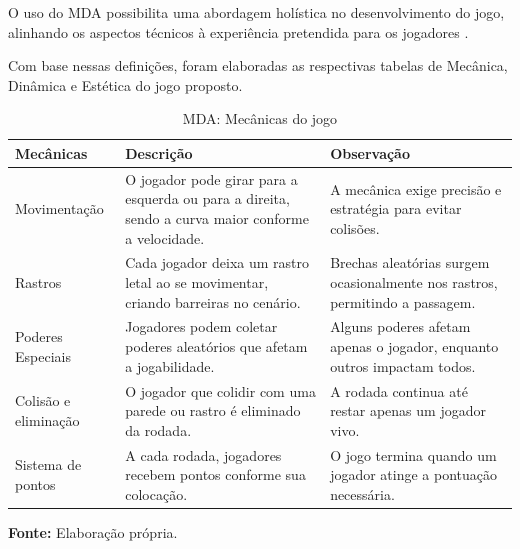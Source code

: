 O uso do MDA possibilita uma abordagem holística no desenvolvimento do jogo, alinhando os aspectos técnicos à experiência pretendida para os jogadores \cite{carroll2000}.

Com base nessas definições, foram elaboradas as respectivas tabelas de Mecânica, Dinâmica e Estética do jogo proposto.

\begin{table}[H]
\centering
\caption{MDA: Mecânicas do jogo}
\label{tab:mecanicas}
\begin{tabularx}{\textwidth}{|l|X|X|}
\hline
\textbf{Mecânicas} & \textbf{Descrição} & \textbf{Observação} \\
\hline
Movimentação & O jogador pode girar para a esquerda ou para a direita, sendo a curva maior conforme a velocidade. & A mecânica exige precisão e estratégia para evitar colisões. \\
\hline
Rastros & Cada jogador deixa um rastro letal ao se movimentar, criando barreiras no cenário. & Brechas aleatórias surgem ocasionalmente nos rastros, permitindo a passagem. \\
\hline
Poderes Especiais & Jogadores podem coletar poderes aleatórios que afetam a jogabilidade. & Alguns poderes afetam apenas o jogador, enquanto outros impactam todos. \\
\hline
Colisão e eliminação & O jogador que colidir com uma parede ou rastro é eliminado da rodada. & A rodada continua até restar apenas um jogador vivo. \\
\hline
Sistema de pontos & A cada rodada, jogadores recebem pontos conforme sua colocação. & O jogo termina quando um jogador atinge a pontuação necessária. \\
\hline
\end{tabularx}

\vspace{0.3em}
\small \textbf{Fonte:} Elaboração própria.
\end{table}


